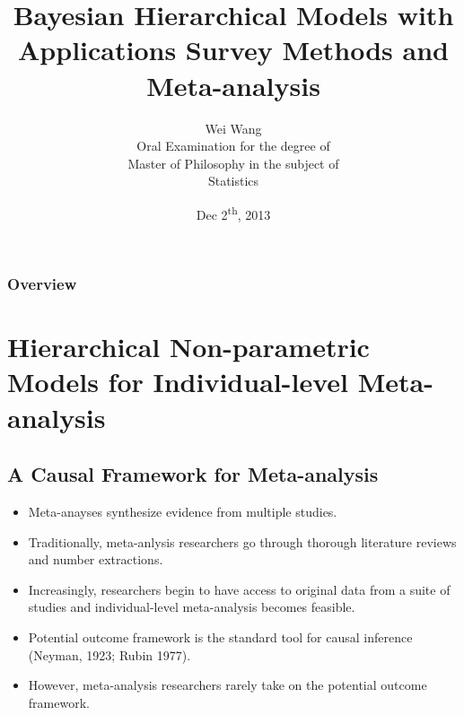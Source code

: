 \documentclass[xetex,mathserif,serif]{beamer}
\title{Bayesian Hierarchical Models with Applications Survey Methods and Meta-analysis}
\author{Wei Wang \\ Oral Examination for the degree of \\ Master of Philosophy in
  the subject of \\ Statistics}
\date{Dec 2\textsuperscript{th}, 2013}
\begin{document}
\frame{\titlepage}

%
% 

\begin{frame}
  \frametitle{Overview}
\tableofcontents
\end{frame}
\section{Hierarchical Non-parametric Models for Individual-level Meta-analysis}
\subsection{A Causal Framework for Meta-analysis}
\begin{frame}
  \begin{itemize}
  \item Meta-anayses synthesize evidence from multiple studies.
  \item Traditionally, meta-anlysis researchers go through thorough literature
    reviews and number extractions.
  \item Increasingly, researchers begin to have access to original data from a
    suite of studies and individual-level meta-analysis becomes feasible.
  \end{itemize}
\end{frame}

\begin{frame}
  \begin{itemize}
  \item Potential outcome framework is the standard tool for causal inference
    (Neyman, 1923; Rubin 1977).
  \item However, meta-analysis researchers rarely take on the potential outcome
    framework.
  \end{itemize}
\end{frame}
\end{document}
